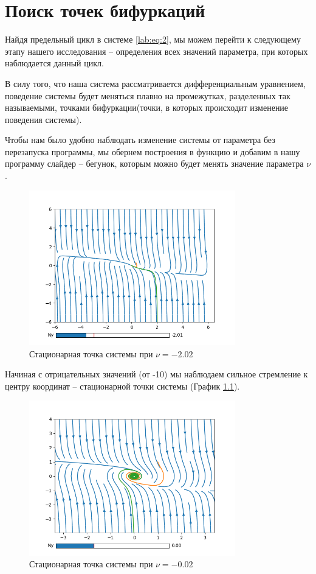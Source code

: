 \chapter{Поиск точек бифуркаций}

Найдя предельный цикл в системе \ref{lab:eq:2}, мы можем перейти к следующему
этапу нашего исследования -- определения всех значений параметра, при которых
наблюдается данный цикл.

В силу того, что наша система рассматривается дифференциальным уравнением,
поведение системы будет меняться плавно на промежутках, разделенных так
называемыми, точками бифуркации(точки, в которых происходит изменение
поведения системы).

Чтобы нам было удобно наблюдать изменение системы от параметра без перезапуска
программы, мы обернем построения в функцию и добавим в нашу программу слайдер --
бегунок, которым можно будет менять значение параметра $\nu$.

\begin{figure}
    \centering
    \includegraphics[width=0.8\textwidth]{figures/2_point_-2_02}
    \caption{Стационарная точка системы при $\nu = -2.02$}
    \label{lab2:point_-2}
\end{figure}

Начиная с отрицательных значений (от -10) мы наблюдаем сильное стремление
к центру координат -- стационарной точки системы (График \ref{lab2:point_-2}).

\begin{figure}[!ht]
    \centering
    \includegraphics[width=0.8\textwidth]{figures/2_point_0}
    \caption{Стационарная точка системы при $\nu = -0.02$}
    \label{lab2:point_0}
\end{figure}

